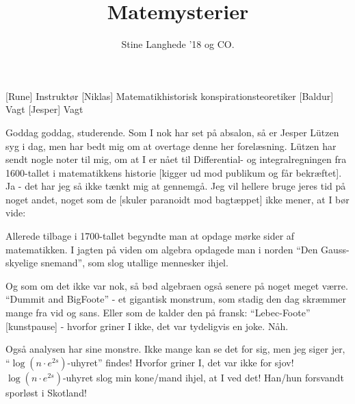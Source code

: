 \documentclass[a4paper,11pt]{article}
\title{Matemysterier}
\author{Stine Langhede ’18 og CO.}
\begin{document}
\maketitle

\begin{roles}
[Rune] Instruktør
[Niklas] Matematikhistorisk konspirationsteoretiker
[Baldur] Vagt
[Jesper] Vagt
\end{roles}



\begin{sketch}

 Goddag goddag, studerende. Som I nok har set på absalon, så er Jesper Lützen syg i dag, men har bedt mig om at overtage denne her forelæsning. Lützen har sendt nogle noter til mig, om at I er nået til Differential- og integralregningen fra 1600-tallet i matematikkens historie [kigger ud mod publikum og får bekræftet]. Ja - det har jeg så ikke tænkt mig at gennemgå. Jeg vil hellere bruge jeres tid på noget andet, noget som de [skuler paranoidt mod bagtæppet] ikke mener, at I bør vide:


 Allerede tilbage i 1700-tallet begyndte man at opdage mørke sider af matematikken. I jagten på viden om algebra opdagede man i norden “Den Gauss-skyelige snemand”, som slog utallige mennesker ihjel.

 Og som om det ikke var nok, så bød algebraen også senere på noget meget værre. “Dummit and BigFoote” - et gigantisk monstrum, som stadig den dag skræmmer mange fra vid og sans. Eller som de kalder den på fransk: “Lebec-Foote” [kunstpause] - hvorfor griner I ikke, det var tydeligvis en joke. Nåh.

 Også analysen har sine monstre. Ikke mange kan se det for sig, men jeg siger jer, “$\log(n \cdot e^{2s})$-uhyret” findes! Hvorfor griner I, det var ikke for sjov! $\log(n \cdot e^{2s})$-uhyret slog min kone/mand ihjel, at I ved det! Han/hun forsvandt sporløst i Skotland!



\end{sketch}
\end{document}
